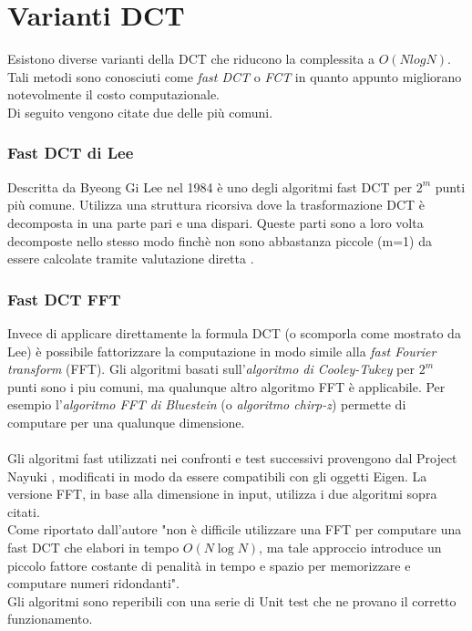 \documentclass[a4paper,12pt]{report}
\begin{document}
\section{Varianti DCT}
Esistono diverse varianti della DCT che riducono la complessita a \(O(NlogN)\). Tali metodi sono conosciuti come \textit{fast DCT} o \textit{FCT} in quanto appunto migliorano notevolmente il costo computazionale.\\Di seguito vengono citate due delle più comuni.

\subsubsection*{Fast DCT di Lee}
Descritta da Byeong Gi Lee \cite{Lee} nel 1984 è uno degli algoritmi fast DCT per \(2^m\) punti più comune. Utilizza una struttura ricorsiva dove la trasformazione DCT è decomposta in una parte pari e una dispari. Queste parti sono a loro volta decomposte nello stesso modo finchè non sono abbastanza piccole (m=1) da essere calcolate tramite valutazione diretta \cite{LAGERSTRM2001DesignAI}.

\subsubsection*{Fast DCT FFT}
Invece di applicare direttamente la formula DCT (o scomporla come mostrato da Lee) è possibile fattorizzare la computazione in modo simile alla \textit{fast Fourier transform} (FFT). Gli algoritmi basati sull'\textit{algoritmo di Cooley-Tukey} \cite{10.2307/2003354} per \(2^m\) punti sono i piu comuni, ma qualunque altro algoritmo FFT è applicabile. Per esempio l'\textit{algoritmo FFT di Bluestein} (o \textit{algoritmo chirp-z}) permette di computare per una qualunque dimensione.\\\\

Gli algoritmi fast utilizzati nei confronti e test successivi provengono dal Project Nayuki \cite{nayuki}, modificati in modo da essere compatibili con gli oggetti Eigen. La versione FFT, in base alla dimensione in input, utilizza i due algoritmi sopra citati.\\
Come riportato dall'autore "non è difficile utilizzare una FFT per computare una fast DCT che elabori in tempo \(O(N\log{N})\), ma tale approccio introduce un piccolo fattore costante di penalità in tempo e spazio per memorizzare e computare numeri ridondanti".\\Gli algoritmi sono reperibili con una serie di Unit test che ne provano il corretto funzionamento.
\end{document}
